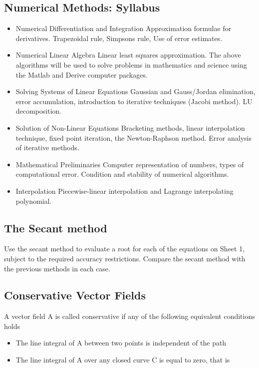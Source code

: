 \documentclass[12pt, a4paper]{article}
\begin{document}
\subsection*{Numerical Methods: Syllabus}
\begin{itemize}
\item Numerical Differentiation and Integration Approximation formulae for derivatives. Trapezoidal rule, Simpsons rule, Use of error estimates.
\item Numerical Linear Algebra Linear least squares approximation. The above algorithms will be used to solve problems in mathematics and science using the Matlab and Derive computer packages.
\item Solving Systems of Linear Equations Gaussian and Gauss/Jordan elimination, error accumulation, introduction to iterative techniques (Jacobi method). LU decomposition.
\item Solution of Non-Linear Equations Bracketing methods, linear interpolation technique, fixed point iteration, the Newton-Raphson method. Error analysis of iterative methods.
\item Mathematical Preliminaries Computer representation of numbers, types of computational error. Condition and stability of numerical algorithms.
\item Interpolation Piecewise-linear interpolation and Lagrange interpolating polynomial.
\end{itemize}

\subsection*{The Secant method }

Use the secant method to evaluate a root for each of the equations on Sheet 1, subject to
the required accuracy restrictions. Compare the secant method with the previous methods
in each case.

\subsection*{Conservative Vector Fields }
A vector field A is called conservative if any of the following equivalent
conditions holds
\begin{itemize}
\item The line integral of A between two points is independent of the path
\item The line integral of A over any closed curve C is equal to zero, that is
\end{itemize}
\end{document}
